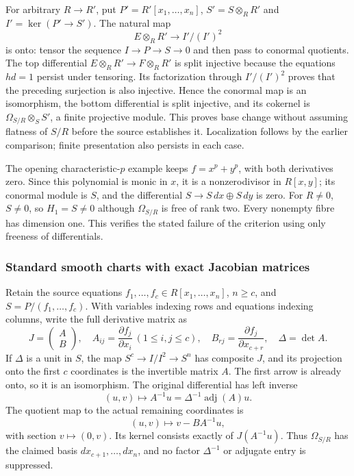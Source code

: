 For arbitrary \(R\to R'\), put \(P'=R'[x_1,\ldots,x_n]\), \(S'=S\otimes_RR'\) and \(I'=\ker(P'\to S')\). The natural map \[
E\otimes_RR'\longrightarrow I'/(I')^2
\] is onto: tensor the sequence \(I\to P\to S\to0\) and then pass to conormal quotients. The top differential \(E\otimes_RR'\to F\otimes_RR'\) is split injective because the equations \(hd=1\) persist under tensoring. Its factorization through \(I'/(I')^2\) proves that the preceding surjection is also injective. Hence the conormal map is an isomorphism, the bottom differential is split injective, and its cokernel is \(\Omega_{S/R}\otimes_SS'\), a finite projective module. This proves base change without assuming flatness of \(S/R\) before the source establishes it. Localization follows by the earlier comparison; finite presentation also persists in each case.

The opening characteristic-\(p\) example keeps \(f=x^p+y^p\), with both derivatives zero. Since this polynomial is monic in \(x\), it is a nonzerodivisor in \(R[x,y]\); its conormal module is \(S\), and the differential \(S\to S\,dx\oplus S\,dy\) is zero. For \(R\ne0\), \(S\ne0\), so \(H_1=S\ne0\) although \(\Omega_{S/R}\) is free of rank two. Every nonempty fibre has dimension one. This verifies the stated failure of the criterion using only freeness of differentials.

\subsubsection{Standard smooth charts with exact Jacobian matrices}\label{algebra-proof-047-standard-smooth-charts-with-exact-jacobian-matrices}

Retain the source equations \(f_1,\ldots,f_c\in R[x_1,\ldots,x_n]\), \(n\ge c\), and \(S=P/(f_1,\ldots,f_c)\). With variables indexing rows and equations indexing columns, write the full derivative matrix as \[
J=\begin{pmatrix}A\\B\end{pmatrix},\quad
A_{ij}=\frac{\partial f_j}{\partial x_i}\ (1\le i,j\le c),\quad
B_{rj}=\frac{\partial f_j}{\partial x_{c+r}},\quad
\Delta=\det A.
\] If \(\Delta\) is a unit in \(S\), the map \(S^c\to I/I^2\to S^n\) has composite \(J\), and its projection onto the first \(c\) coordinates is the invertible matrix \(A\). The first arrow is already onto, so it is an isomorphism. The original differential has left inverse \[
(u,v)\longmapsto A^{-1}u=\Delta^{-1}\operatorname{adj}(A)u.
\] The quotient map to the actual remaining coordinates is \[
(u,v)\longmapsto v-BA^{-1}u,
\] with section \(v\mapsto(0,v)\). Its kernel consists exactly of \(J(A^{-1}u)\). Thus \(\Omega_{S/R}\) has the claimed basis \(dx_{c+1},\ldots,dx_n\), and no factor \(\Delta^{-1}\) or adjugate entry is suppressed.

